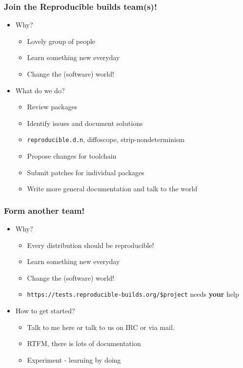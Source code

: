\documentclass[14pt]{beamer}
\begin{document}
\begin{frame}
 \frametitle{Join the Reproducible builds team(s)!}

 \begin{itemize}
  \item Why?
   \begin{itemize}
    \item \heartsuit{}\heartsuit{}\heartsuit{} Lovely group of people \heartsuit{}\heartsuit{}\heartsuit{}
    \item Learn something new everyday
    \item Change the (software) world!
   \end{itemize}
  \item What do we do?
   \begin{itemize}
    \item Review packages
    \item Identify issues and document solutions
    \item \texttt{reproducible.d.n}, diffoscope, strip-nondeterminism
    \item Propose changes for toolchain
    \item Submit patches for individual packages
    \item Write more general documentation and talk to the world
   \end{itemize}
 \end{itemize}
\end{frame}

\begin{frame}
 \frametitle{Form another team!}

 \begin{itemize}
  \item Why?
   \begin{itemize}
    \item Every distribution should be reproducible!
    \item Learn something new everyday
    \item Change the (software) world!
    \item \texttt{https://tests.reproducible-builds.org/\$project} needs
    \textbf{your} help
   \end{itemize}
  \item How to get started?
   \begin{itemize}
    \item Talk to me here or talk to us on IRC or via mail.
    \item RTFM, there is lots of documentation
    \item Experiment - learning by doing
   \end{itemize}
 \end{itemize}
\end{frame}
\end{document}
